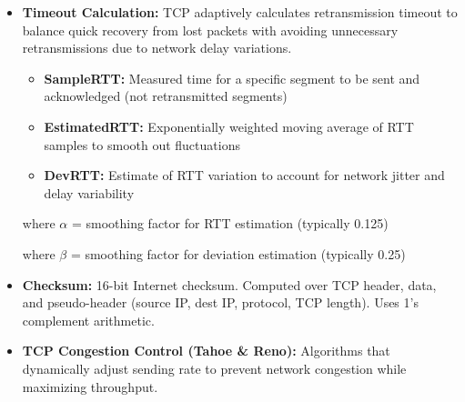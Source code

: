 \begin{minipage}[htp]{0.5\textwidth}
\begin{itemize}[noitemsep,nolistsep,topsep=0px,partopsep=0pt,parsep=0pt]
        \begin{center}
        \end{center}
        where MTU = Maximum Transmission Unit of the network path (typically 1500 bytes for Ethernet), IP header = 20 bytes (without options), TCP header = 20 bytes (without options). Standard Ethernet MSS = 1460 bytes. MSS is negotiated during TCP connection establishment via MSS option in SYN segments.
        \item[-] \textbf{Timeout Calculation:} TCP adaptively calculates retransmission timeout to balance quick recovery from lost packets with avoiding unnecessary retransmissions due to network delay variations.
        \begin{itemize}[noitemsep,nolistsep,topsep=-5px,partopsep=0pt,parsep=0pt]
            \item \textbf{SampleRTT:} Measured time for a specific segment to be sent and acknowledged (not retransmitted segments)
            \item \textbf{EstimatedRTT:} Exponentially weighted moving average of RTT samples to smooth out fluctuations
            \item \textbf{DevRTT:} Estimate of RTT variation to account for network jitter and delay variability
        \end{itemize}
        \begin{center}
        \end{center}
        where $\alpha$ = smoothing factor for RTT estimation (typically 0.125)
        \begin{center}
        \end{center}
        where $\beta$ = smoothing factor for deviation estimation (typically 0.25)
        \begin{center}
        \end{center}
                \item[-] \textbf{Checksum:} 16-bit Internet checksum. Computed over TCP header, data, and pseudo-header (source IP, dest IP, protocol, TCP length). Uses 1's complement arithmetic.
                \item[-] \textbf{TCP Congestion Control (Tahoe \& Reno):} Algorithms that dynamically adjust sending rate to prevent network congestion while maximizing throughput.

\end{itemize}
\end{minipage}
